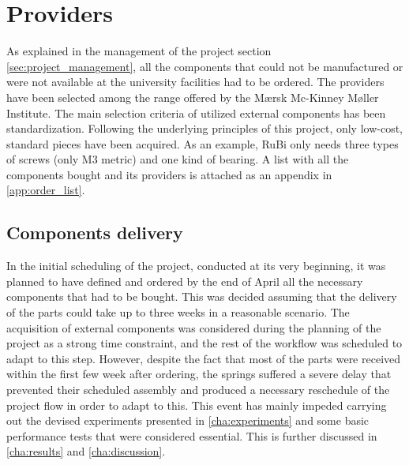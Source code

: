 \section{Providers} %
\label{sec:providers}
As explained in the management of the project section \ref{sec:project_management}, all the components that could not be manufactured or were not available at the university facilities had to be ordered.
The providers have been selected among the range offered by the Mærsk Mc-Kinney Møller Institute.
The main selection criteria of utilized external components has been standardization.
Following the underlying principles of this project, only low-cost, standard pieces have been acquired. As an example, RuBi only needs three types of screws (only M3 metric) and one kind of bearing.
A list with all the components bought and its providers is attached as an appendix in \ref{app:order_list}.

\subsection{Components delivery} %
\label{sub:components_delivery}
In the initial scheduling of the project, conducted at its very beginning, it was planned to have defined and ordered by the end of April all the necessary components that had to be bought.
This was decided assuming that the delivery of the parts could take up to three weeks in a reasonable scenario.
The acquisition of external components was considered during the planning of the project as a strong time constraint, and the rest of the workflow was scheduled to adapt to this step.
However, despite the fact that most of the parts were received within the first few week after ordering, the springs suffered a severe delay that prevented their scheduled assembly and produced a necessary reschedule of the project flow in order to adapt to this.
This event has mainly impeded carrying out the devised experiments presented in \ref{cha:experiments} and some basic performance tests that were considered essential.
This is further discussed in \ref{cha:results} and \ref{cha:discussion}.


